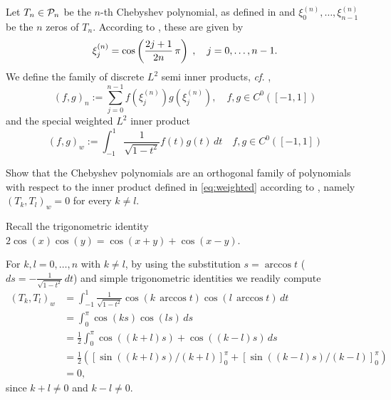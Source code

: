 \begin{problem}\label{prob:ChebPolyProp}
  
  Let $T_{n}\in{\cal P}_{n}$ be the $n$-th Chebyshev polynomial, as defined in  and $\xi_0^{(n)},\dots,\xi_{n-1}^{(n)}$ be the $n$ zeros of $T_n$. According to  , these are given by
\begin{equation}\label{eq:zeros}
  \xi^{(n)}_{j} = \cos\left(\frac{2j+1}{2n}\,\pi\right)\;,
    \quad j=0,\ldots,n-1.
\end{equation}
  We define the family of discrete $L^2$ semi inner products, \emph{cf.} ,
\begin{equation}\label{eq:discrete}
  (f,g)_n:=\sum_{j=0}^{n-1} f(\xi_j^{(n)}) g(\xi_j^{(n)}),\quad f,g\in C^0([-1,1])
\end{equation}
and the special weighted $L^2$ inner product
\begin{equation}\label{eq:weighted}
  (f,g)_w:=\int_{-1}^1 \frac{1}{\sqrt{1-t^2}} f(t) g(t)\,dt \quad f,g\in C^0([-1,1])
\end{equation}

\begin{subproblem}[2] 
    Show that the Chebyshev polynomials are an orthogonal family of polynomials with respect to the inner product defined in \eqref{eq:weighted} according to , namely $(T_k,T_l)_w=0$ for every $k\neq l$.

    \begin{hint}
      Recall the trigonometric identity $2\cos(x)\cos(y) = \cos(x+y)+\cos(x-y)$.
    \end{hint}

\begin{solution}
For $k,l=0,\dots,n$ with $k\neq l$, by using the substitution $s=\arccos t$ ($ds=- \frac{1}{\sqrt{1-t^2}}\,dt$) and simple trigonometric identities we readily compute
\[
\begin{split}
(T_k,T_l)_w &= \int_{-1}^1 \frac{1}{\sqrt{1-t^2}} \cos(k\,\arccos t) \cos(l\,\arccos t)\,dt \\
&= \int_{0}^\pi  \cos(k s) \cos(l s)\,ds \\
&=\frac{1}{2} \int_{0}^\pi  \cos((k+l) s) + \cos((k-l) s)\,ds \\
&= \frac{1}{2}( [\sin((k+l)s)/(k+l)]^\pi_0 + [\sin((k-l)s)/(k-l)]^\pi_0)\\
&=0,
\end{split}
\]
since $k+l\neq 0$ and $k-l\neq 0$.
\end{solution}
\end{subproblem}


\end{problem}
